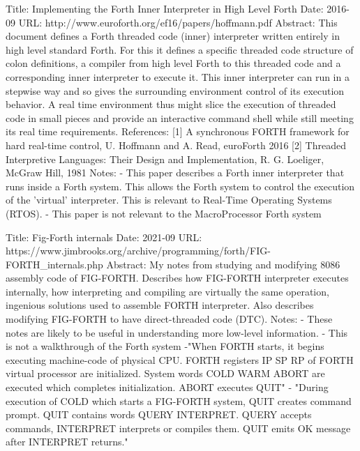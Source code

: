 \documentclass[
    letterpaper, %
	fontsize=10pt, %
	twoside=true, %
	numbers=noenddot, %
]{kaobook}
\begin{document}
\printbibliography[heading=bibintoc, title=Bibliography, prenote=bibnote] %


Title:  Implementing the Forth Inner Interpreter in High Level Forth
Date:  2016-09
URL:  http://www.euroforth.org/ef16/papers/hoffmann.pdf
Abstract:  This document defines a Forth threaded code (inner) interpreter written entirely in
    high level standard Forth. For this it defines a specific threaded code structure of colon
    definitions, a compiler from high level Forth to this threaded code and a corresponding
    inner interpreter to execute it. This inner interpreter can run in a stepwise way and so gives
    the surrounding environment control of its execution behavior. A real time environment
    thus might slice the execution of threaded code in small pieces and provide an interactive
    command shell while still meeting its real time requirements.
References:
    [1] A synchronous FORTH framework for hard real-time control, U. Hoffmann and A. Read, euroForth 2016
    [2] Threaded Interpretive Languages: Their Design and Implementation, R. G. Loeliger, McGraw Hill, 1981
Notes:
   - This paper describes a Forth inner interpreter that runs inside a Forth system. This allows
   the Forth system to control the execution of the 'virtual' interpreter. This is relevant
   to Real-Time Operating Systems (RTOS).
   - This paper is not relevant to the MacroProcessor Forth system

Title:  Fig-Forth internals
Date: 2021-09
URL:  https://www.jimbrooks.org/archive/programming/forth/FIG-FORTH\_internals.php
Abstract:  My notes from studying and modifying 8086 assembly code of FIG-FORTH. Describes
    how FIG-FORTH interpreter executes internally, how interpreting and compiling are virtually 
    the same operation, ingenious solutions used to assemble FORTH interpreter. Also describes 
    modifying FIG-FORTH to have direct-threaded code (DTC). 
Notes:
    - These notes are likely to be useful in understanding more low-level information.
    - This is not a walkthrough of the Forth system
    -"When FORTH starts, it begins executing machine-code of physical CPU. FORTH registers 
    IP SP RP of FORTH virtual processor are initialized. System words COLD WARM ABORT are 
    executed which completes initialization. ABORT executes QUIT"
    - "During execution of COLD which starts a FIG-FORTH system, QUIT creates command 
    prompt. QUIT contains words QUERY INTERPRET. QUERY accepts commands, INTERPRET 
    interprets or compiles them. QUIT emits OK message after INTERPRET returns."
\end{document}

